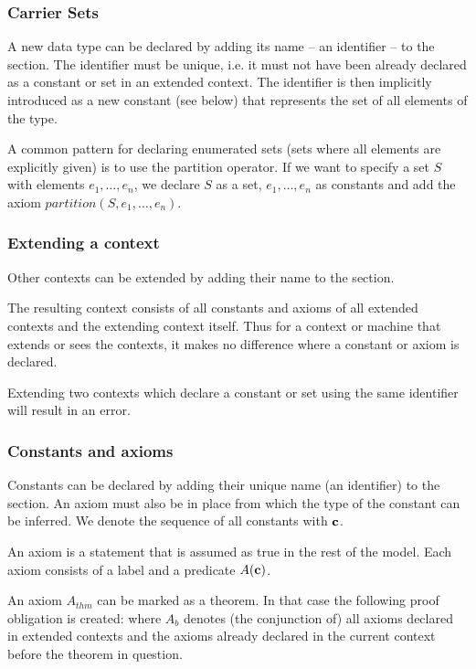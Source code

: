 \subsubsection{Carrier Sets}
\label{carrier_sets}
A new data type can be declared by adding its name -- an identifier -- to the  section.
The identifier must be unique, i.e. it must not have been already declared as a constant or set in an extended context.
The identifier is then implicitly introduced as a new constant (see below) that represents the set of all elements of the type. 

A common pattern for declaring enumerated sets (sets where all elements are explicitly given)
is to use the partition operator. If we want to specify a set $S$ with elements $e_1,\ldots,e_n$,
we declare $S$ as a set, $e_1,\ldots,e_n$ as constants and add the axiom $partition(S,e_1,\ldots,e_n)$.

\subsubsection{Extending a context}
Other contexts can be extended by adding their name to the  section.

The resulting context consists of all constants and axioms of all extended contexts and the extending context itself.
Thus for a context or machine that extends or sees the contexts, it makes no difference where a constant or axiom is declared.

Extending two contexts which declare a constant or set using the same identifier will result in an error.

\subsubsection{Constants and axioms}
\label{constants_and_axioms}
Constants can be declared by adding their unique name (an identifier) to the  section.
An axiom must also be in place from which the type of the constant can be inferred.
We denote the sequence of all constants with $\mathbf{c}$.

An axiom is a statement that is assumed as true in the rest of the model.
Each axiom consists of a label and a predicate $A(\mathbf{c})$.

An axiom $A_{thm}$ can be marked as a theorem. In that case the following proof obligation is created:
where $A_b$ denotes (the conjunction of) all axioms declared in extended contexts and the axioms already declared in the current context before the theorem in question.

